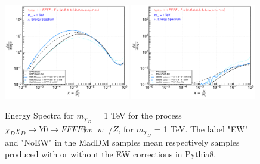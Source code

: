 \documentclass[epj,nopacs,fleqn]{svjour}
\begin{document}
\begin{figure}[!b]
\subfigure
{ \includegraphics[width=0.49\textwidth]{Fig/xdxd_FFFF_WZ/1_neutrinos_mu_FFFF_1.pdf}}
\subfigure
{ \includegraphics[width=0.49\textwidth]{Fig/xdxd_FFFF_WZ/1_neutrinos_tau_FFFF_1.pdf}}
\caption{Energy Spectra for $m_{\chi_D}$ = 1 TeV for the process $\chi_D \chi_D \rightarrow Y0 \rightarrow FFFF \$w^- w^+ /Z $, for $m_{\chi_D}$ = 1 TeV. The label "EW" and "NoEW" in the MadDM samples mean respectively samples produced with or without the EW corrections in Pythia8.}
\label{woff_1}
\end{figure}
\end{document}
